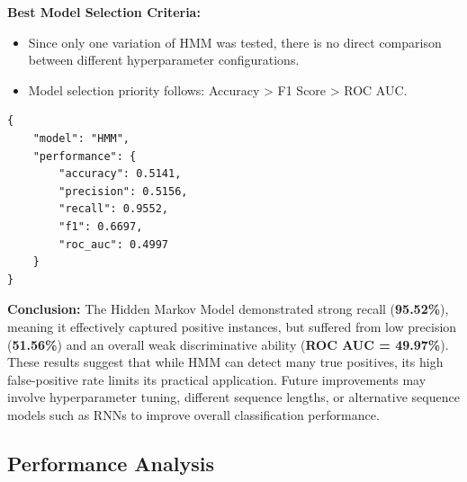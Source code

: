 \textbf{Best Model Selection Criteria:}

\begin{itemize}
    \item Since only one variation of HMM was tested, there is no direct comparison between different hyperparameter configurations.
    \item Model selection priority follows: Accuracy > F1 Score > ROC AUC.
\end{itemize}

\begin{verbatim}
{
    "model": "HMM",
    "performance": {
        "accuracy": 0.5141,
        "precision": 0.5156,
        "recall": 0.9552,
        "f1": 0.6697,
        "roc_auc": 0.4997
    }
}
\end{verbatim}

\textbf{Conclusion:} The Hidden Markov Model demonstrated strong recall (\textbf{95.52\%}), meaning it effectively captured positive instances, but suffered from low precision (\textbf{51.56\%}) and an overall weak discriminative ability (\textbf{ROC AUC = 49.97\%}). These results suggest that while HMM can detect many true positives, its high false-positive rate limits its practical application. Future improvements may involve hyperparameter tuning, different sequence lengths, or alternative sequence models such as RNNs to improve overall classification performance.

\subsection{Performance Analysis}


